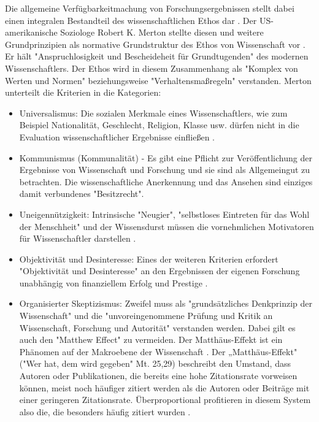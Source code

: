 \begin{enumerate}
\begin{end}
Die allgemeine Verfügbarkeitmachung von Forschungsergebnissen stellt dabei einen integralen Bestandteil des wissenschaftlichen Ethos dar \cite{Fangerau_2014}. Der US-amerikanische Soziologe Robert K. Merton stellte diesen und weitere Grundprinzipien als normative Grundstruktur des Ethos von Wissenschaft vor \cite{Merton_1985}. Er hält "Anspruchlosigkeit und Bescheideheit für Grundtugenden" \cite{hagner_2015_sache_buches} des modernen Wissenschaftlers. Der Ethos wird in diesem Zusammenhang als "Komplex von Werten und Normen"\cite{suchen} beziehungsweise "Verhaltensmaßregeln"\cite{suchen} verstanden. Merton unterteilt die Kriterien in die Kategorien:
\begin{itemize}
\item Universalismus: Die sozialen Merkmale eines Wissenschaftlers, wie zum Beispiel Nationalität, Geschlecht, Religion, Klasse usw. dürfen nicht in die Evaluation wissenschaftlicher Ergebnisse einfließen \cite{suchen}.
\item Kommunismus (Kommunalität) - Es gibt eine Pflicht zur Veröffentlichung der Ergebnisse von Wissenschaft und Forschung und sie sind als Allgemeingut zu betrachten. Die wissenschaftliche Anerkennung und das Ansehen sind einziges damit verbundenes "Besitzrecht"\cite{suchen}.
\item Uneigennützigkeit: Intrinsische "Neugier"\cite{suchen}, "selbstloses Eintreten für das Wohl der Menschheit"\cite{suchen} und der Wissensdurst müssen die vornehmlichen Motivatoren für Wissenschaftler darstellen \cite{suchen}.
\item Objektivität und Desinteresse: Eines der weiteren Kriterien erfordert "Objektivität und Desinteresse" an den Ergebnissen der eigenen Forschung \cite{suchen} unabhängig von finanziellem Erfolg und Prestige \cite{suchen}.
\item Organisierter Skeptizismus: Zweifel muss als "grundsätzliches Denkprinzip der Wissenschaft" \cite{suchen} und die "unvoreingenommene Prüfung und Kritik an Wissenschaft, Forschung und Autorität" \cite{suchen} verstanden werden. Dabei gilt es auch den "Matthew Effect" zu vermeiden. Der Matthäus-Effekt ist ein Phänomen auf der Makroebene der Wissenschaft \cite{bonitz_1998_matthaus}. Der „Matthäus-Effekt" ("Wer hat, dem wird gegeben" Mt. 25,29) beschreibt den Umstand, dass Autoren oder Publikationen, die bereits eine hohe Zitationsrate vorweisen können, meist noch häufiger zitiert werden als die Autoren oder Beiträge mit einer geringeren Zitationsrate. Überproportional profitieren in diesem System also die, die besonders häufig zitiert wurden \cite{Merton_1968} \cite{meier_2009_matthaus}.
\end{itemize}


\end{end}
\end{enumerate}

